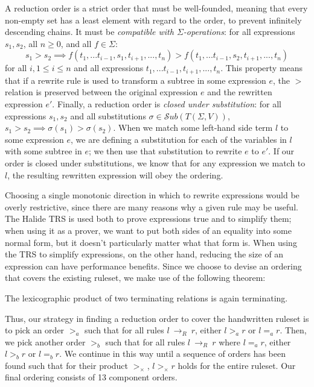 \documentclass[acmsmall,review,anonymous]{acmart}\settopmatter{printfolios=true,printccs=false,printacmref=false}
\newcommand{\rewrites}[0]{\:\rightarrow_{R}\:}
\begin{document}
A reduction order is a strict order that must be well-founded, meaning that every non-empty set has a least element with regard to the order, to prevent infinitely descending chains. It must be \emph{compatible with $\Sigma$-operations}: for all expressions $s_1, s_2$, all $n \geq 0$, and all $f \in \Sigma$:
\[
s_1 > s_2 \implies f(t_1,...t_{i-1},s_1,t_{i+1},...,t_n) > f(t_1,...t_{i-1},s_2,t_{i+1},...,t_n)
\]
for all $i, 1 \leq i \leq n$ and all expressions $t_1,...t_{i-1},t_{i+1},...,t_n$. This property means that if a rewrite rule is used to transform a subtree in some expression $e$, the $>$ relation is preserved between the original expression $e$ and the rewritten expression $e'$. Finally, a reduction order is \emph{closed under substitution}: for all expressions $s_1, s_2$ and all substitutions $\sigma \in \mathcal{S}ub(T(\Sigma,V))$, 
$s_1 > s_2 \implies \sigma(s_1) > \sigma(s_2)$. When we match some left-hand side term $l$ to some expression $e$, we are defining a substitution for each of the variables in $l$ with some subtree in $e$; we then use that substitution to rewrite $e$ to $e'$. If our order is closed under substitutions, we know that for any expression we match to $l$, the resulting rewritten expression will obey the ordering.

Choosing a single monotonic direction in which to rewrite expressions would be overly restrictive, since there are many reasons why a given rule may be useful. The Halide TRS is used both to prove expressions true and to simplify them; when using it as a prover, we want to put both sides of an equality into some normal form, but it doesn't particularly matter what that form is. When using the TRS to simplify expressions, on the other hand, reducing the size of an expression can have performance benefits. Since we choose to devise an ordering that covers the existing ruleset, we make use of the following theorem:

\begin{theorem}
The lexicographic product of two terminating relations is again terminating.
\end{theorem}

Thus, our strategy in finding a reduction order to cover the handwritten ruleset is to pick an order $>_a$ such that for all rules $l \rewrites r$, either $l >_a r$ or $l =_a r$. Then, we pick another order $>_b$ such that for all rules $l \rewrites r$ where $l =_a r$, either $l >_b r$ or $l =_b r$. We continue in this way until a sequence of orders has been found such that for their product $>_{\times}$, $l >_{\times} r$ holds for the entire ruleset.  Our final ordering consists of 13 component orders.
\end{document}
